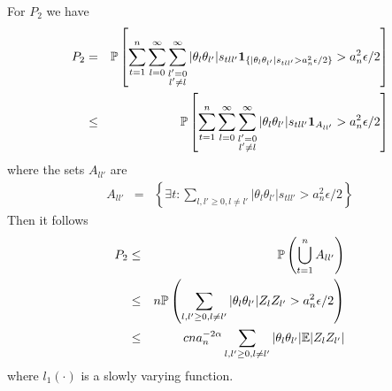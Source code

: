 \documentclass{article}
\begin{document}
For $P_2$ we have
\begin{eqnarray*}
  P_2 &=& \mathbb{P}\left[
    \sum_{t=1}^n \sum_{l=0}^\infty \sum_{\substack{l'=0 \\l'\neq
        l}}^\infty |\theta_l \theta_{l'}|s_{tll'} \mathbf{1}_{\{|\theta_l
      \theta_{l'}|s_{tll'} > a_n^2 \epsilon/2\}} > a_n^2
    \epsilon/2\right] \\
  &\leq& \mathbb{P}\left[
    \sum_{t=1}^n \sum_{l=0}^\infty \sum_{\substack{l'=0 \\l'\neq
        l}}^\infty |\theta_l \theta_{l'}|s_{tll'} \mathbf{1}_{A_{ll'}}
    > a_n^2 \epsilon/2\right]
\end{eqnarray*}
where the sets $A_{ll'}$ are
\begin{eqnarray*}
  A_{ll'} &=& \left\{
    \exists t:\sum_{l,l' \geq 0, l\neq l'}|\theta_l
    \theta_{l'}|s_{tll'} > a_n^2 \epsilon/2\right\}
\end{eqnarray*}
Then it follows
\begin{eqnarray*}
  P_2 &\leq& \mathbb{P}\left(
    \bigcup_{t=1}^{n} A_{ll'}
  \right) \\
  &\leq& n\mathbb{P}\left(\sum_{l,l' \geq 0, l\neq l'}|\theta_l
    \theta_{l'}|Z_lZ_{l'} > a_n^2 \epsilon/2\right) \\
  &\leq& c n a_n^{-2\alpha} \sum_{l,l' \geq 0, l\neq l'}|\theta_l
    \theta_{l'}| \mathbb{E} |Z_lZ_{l'}|
\end{eqnarray*}
where $l_1(\cdot)$ is a slowly varying function.
\end{document}
